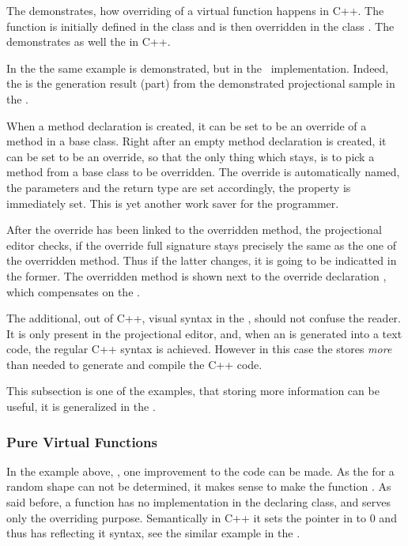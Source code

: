 The  demonstrates, how overriding of a virtual function happens in C++.
The function  is initially defined in the class  and is then overridden
in the class . The  demonstrates as well the  in C++.


In the  the same example is demonstrated, but in the \pcpp\ implementation.
Indeed, the  is the generation result (part) from the demonstrated projectional sample in
the .

When a method declaration is created, it can be set to be an override of a method in a base class.
Right after an empty method declaration is created, it can be set to be an override, so that the only
thing which stays, is to pick a method from a base class to be overridden. The override is automatically
named, the parameters and the return type are set accordingly, the  property is immediately
set. This is yet another work saver for the programmer.

After the override has been linked to the overridden method, the projectional editor checks, if 
the override full signature stays precisely the same as the one of the overridden method. Thus if the 
latter changes, it is going to be indicatted in the former.
The overridden method is shown next to the override declaration , which 
compensates on the .


The additional, out of C++, visual syntax in the \pcpp, should not confuse the reader. It is only 
present in the projectional editor, and, when an  is generated into a text code, the regular
C++ syntax is achieved. However in this case the  stores \emph{more} than needed to 
generate and compile the C++ code. 

This subsection is one of the examples, that storing more information can be useful,
it is generalized in the .


\subsubsection{Pure Virtual Functions}

In the example above, , one improvement to the code can be made. As the  for a random shape can not 
be determined, it makes sense to make the  function . As said before, a  
function has no implementation in the declaring class, and serves only the overriding purpose. Semantically in C++ it sets the 
pointer in  to 0 and thus has reflecting it syntax, see the similar example in the .

